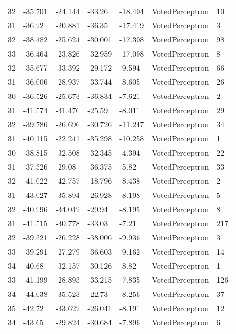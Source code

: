 \begin{tabular}{lllllll}
32 & -35.701 & -24.144 &  -33.26 & -18.404 &    VotedPerceptron &   10 \\
31 &  -36.22 & -20.881 &  -36.35 & -17.419 &    VotedPerceptron &    3 \\
32 & -38.482 & -25.624 & -30.001 & -17.308 &    VotedPerceptron &   98 \\
33 & -36.464 & -23.826 & -32.959 & -17.098 &    VotedPerceptron &    8 \\
32 & -35.677 & -33.392 & -29.172 &  -9.594 &    VotedPerceptron &   66 \\
31 & -36.006 & -28.937 & -33.744 &  -8.605 &    VotedPerceptron &   26 \\
30 & -36.526 & -25.673 & -36.834 &  -7.621 &    VotedPerceptron &    2 \\
31 & -41.574 & -31.476 &  -25.59 &  -8.011 &    VotedPerceptron &   29 \\
32 & -39.786 & -26.696 & -30.726 & -11.247 &    VotedPerceptron &   34 \\
31 & -40.115 & -22.241 & -35.298 & -10.258 &    VotedPerceptron &    1 \\
30 & -38.815 & -32.508 & -32.345 &  -4.394 &    VotedPerceptron &   22 \\
31 & -37.326 &  -29.08 & -36.375 &   -5.82 &    VotedPerceptron &   33 \\
32 & -41.022 & -42.757 & -18.796 &  -8.438 &    VotedPerceptron &    2 \\
31 & -43.027 & -35.894 & -26.928 &  -8.198 &    VotedPerceptron &    5 \\
32 & -40.996 & -34.042 &  -29.94 &  -8.195 &    VotedPerceptron &    8 \\
31 & -41.515 & -30.778 &  -33.03 &   -7.21 &    VotedPerceptron &  217 \\
32 & -39.321 & -26.228 & -38.006 &  -9.936 &    VotedPerceptron &    3 \\
33 & -39.291 & -27.279 & -36.603 &  -9.162 &    VotedPerceptron &   14 \\
34 &  -40.68 & -32.157 & -30.126 &   -8.82 &    VotedPerceptron &    1 \\
33 & -41.199 & -28.893 & -33.215 &  -7.835 &    VotedPerceptron &  126 \\
34 & -44.038 & -35.523 &  -22.73 &  -8.256 &    VotedPerceptron &   37 \\
35 &  -42.72 & -33.622 & -26.041 &  -8.191 &    VotedPerceptron &   12 \\
34 &  -43.65 & -29.824 & -30.684 &  -7.896 &    VotedPerceptron &    6 \\

\end{tabular}
